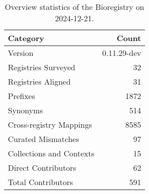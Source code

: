\begin{table}
\caption{Overview statistics of the Bioregistry on 2024-12-21.}
\label{tab:bioregistry-summary}
\begin{tabular}{lr}
\toprule
Category & Count \\
\midrule
Version & 0.11.29-dev \\
Registries Surveyed & 32 \\
Registries Aligned & 31 \\
Prefixes & 1872 \\
Synonyms & 514 \\
Cross-registry Mappings & 8585 \\
Curated Mismatches & 97 \\
Collections and Contexts & 15 \\
Direct Contributors & 62 \\
Total Contributors & 591 \\
\bottomrule
\end{tabular}
\end{table}
